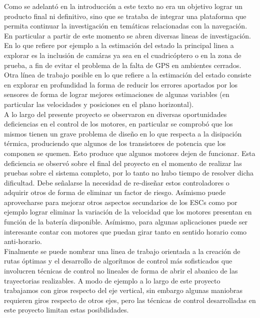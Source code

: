 \documentclass[main]{subfiles}
\begin{document}
Como se adelant\'o en la introducci\'on a este texto no era un objetivo lograr un producto final ni definitivo, sino que se trataba de integrar una plataforma que permita continuar la investigaci\'on en tem\'aticas relacionadas con la navegaci\'on. En particular a partir de este momento se abren diversas lineas de investigaci\'on. En lo que refiere por ejemplo a la estimaci\'on del estado la principal linea a explorar es la inclusi\'on de cam\'aras ya sea en el cuadric\'optero o en la zona de prueba, a fin de evitar el problema de la falta de GPS en ambientes cerrados. Otra línea de trabajo posible en lo que refiere a la estimaci\'on del estado consiste en explorar en profundidad la forma de reducir los errores aportados por los sensores de forma de lograr mejores estimaciones de algunas variables (en particular las velocidades y posiciones en el plano horizontal).\\

A lo largo del presente proyecto se observaron en diversas oportunidades deficiencias en el control de los motores, en particular se comprob\'o que los mismos tienen un grave problema de diseño en lo que respecta a la disipaci\'on t\'ermica, produciendo que algunos de los transistores de potencia que los componen se quemen. Esto produce que algunos motores dejen de funcionar. Esta deficiencia se observ\'o sobre el final del proyecto en el momento de realizar las pruebas sobre el sistema completo, por lo tanto no hubo tiempo de resolver dicha dificultad. Debe se\~nalarse la necesidad de re-diseñar estos controladores o adquirir otros de forma de eliminar un factor de riesgo. As\'imismo puede aprovecharse para mejorar otros aspectos secundarios de los ESCs como por ejemplo lograr eliminar la variaci\'on de la velocidad que los motores presentan en funci\'on de la bater\'ia disponible. As\'imismo, para algunas aplicaciones puede ser interesante contar con motores que puedan girar tanto en sentido horario como anti-horario.\\

Finalmente se puede nombrar una linea de trabajo orientada a la creaci\'on de rutas \'optimas y el desarrollo de algor\'itmos de control m\'as sofisticados que involucren t\'ecnicas de control no lineales de forma de abrir el abanico de las trayectorias realizables. A modo de ejemplo a lo largo de este proyecto trabajamos con giros respecto del eje vertical, sin embargo algunas maniobras requieren giros respecto de otros ejes, pero las t\'ecnicas de control desarrolladas en este proyecto limitan estas posibilidades.\\
\end{document}
